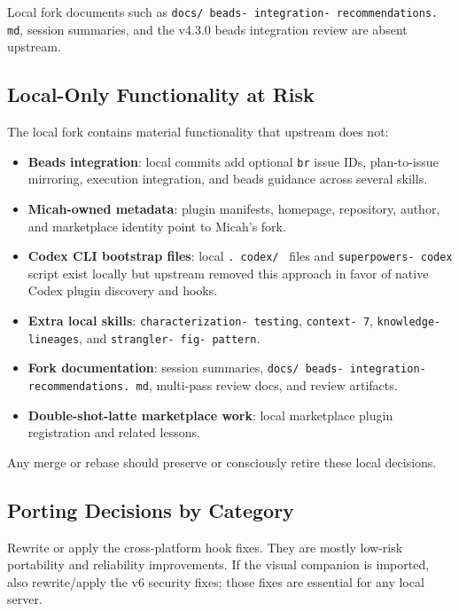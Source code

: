 \documentclass[twocolumn,10pt,letterpaper]{article}
\begin{document}
Local fork documents such as \texttt{docs/ beads- integration- recommendations. md}, session summaries, and the v4.3.0 beads integration review are absent upstream.


\subsection{Local-Only Functionality at Risk}

The local fork contains material functionality that upstream does not:


\begin{itemize}
\setlength{\itemsep}{0pt}
\setlength{\parskip}{0pt}
  \item \textbf{Beads integration}: local commits add optional \texttt{br} issue IDs, plan-to-issue mirroring, execution integration, and beads guidance across several skills.
  \item \textbf{Micah-owned metadata}: plugin manifests, homepage, repository, author, and marketplace identity point to Micah's fork.
  \item \textbf{Codex CLI bootstrap files}: local \texttt{. codex/ } files and \texttt{superpowers- codex} script exist locally but upstream removed this approach in favor of native Codex plugin discovery and hooks.
  \item \textbf{Extra local skills}: \texttt{characterization- testing}, \texttt{context- 7}, \texttt{knowledge- lineages}, and \texttt{strangler- fig- pattern}.
  \item \textbf{Fork documentation}: session summaries, \texttt{docs/ beads- integration- recommendations. md}, multi-pass review docs, and review artifacts.
  \item \textbf{Double-shot-latte marketplace work}: local marketplace plugin registration and related lessons.
\end{itemize}

Any merge or rebase should preserve or consciously retire these local decisions.


\subsection{Porting Decisions by Category}

Rewrite or apply the cross-platform hook fixes. They are mostly low-risk portability and reliability improvements. If the visual companion is imported, also rewrite/apply the v6 security fixes; those fixes are essential for any local server.
\end{document}
